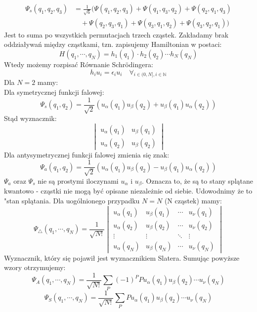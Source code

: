 \begin{align*}
    \Psi_s (q_1, q_2, q_3) &= \frac{1}{\sqrt{6}} \big( 
        \Psi(q_1, q_2, q_3) + \Psi(q_1, q_3, q_2) + \Psi(q_2, q_1, q_3) \\
        &\quad + \Psi(q_2, q_3, q_1) + \Psi(q_3, q_1, q_2) + \Psi(q_3, q_2, q_1)
    \big)
\end{align*}
%
Jest to suma po wszystkich permutacjach trzech cząstek.
%
Zakładamy brak oddziaływań między cząstkami, tzn. zapisujemy Hamiltonian w postaci:
%
\begin{equation*}
    H(q_1, \cdots, q_N) = h_1(q_1) \cdot h_2(q_2) \cdots h_N(q_N)
\end{equation*}
%
Wtedy możemy rozpisać Równanie Schrödingera:
%
\begin{equation*}
    h_i u_i = \epsilon_i u_i \quad \forall_{i \in (0, N], i \in \mathbb{N}}
\end{equation*}
%
Dla $N = 2$ mamy:
%
\\
%
Dla symetrycznej funkcji falowej:
\begin{equation*}
    \Psi_s(q_1, q_2) = \frac{1}{\sqrt{2}} (u_\alpha(q_1) u_\beta(q_2) + u_\beta(q_1) u_\alpha(q_2))
\end{equation*}
%
Stąd wyznacznik:
\begin{equation*}
    \begin{vmatrix}
        u_\alpha(q_1) & u_\beta(q_1) \\
        u_\alpha(q_2) & u_\beta(q_2)
    \end{vmatrix}
\end{equation*}
%
Dla antysymetrycznej funkcji falowej zmienia się znak:
%
\begin{equation*}
    \Psi_a(q_1, q_2) = \frac{1}{\sqrt{2}} (u_\alpha(q_1) u_\beta(q_2) - u_\beta(q_1) u_\alpha(q_2))
\end{equation*}
%
$\Psi_a$ oraz $\Psi_s$ nie są prostymi iloczynami $u_\alpha$ i $u_\beta$.
Oznacza to, że są to stany splątane kwantowo - cząstki nie mogą być opisane niezależnie od siebie.
Udowodnimy że to "stan splątania. Dla uogólnionego przypadku $N = N$ (N cząstek) mamy:
%
\begin{equation*}
    \Psi_\triangle (q_1, \cdots, q_N) = \frac{1}{\sqrt{N!}}
    \begin{vmatrix}
        u_\alpha(q_1) & u_\beta(q_1) & \cdots & u_\nu(q_1) \\
        u_\alpha(q_2) & u_\beta(q_2) & \cdots & u_\nu(q_2) \\
        \vdots & \vdots & \ddots & \vdots \\
        u_\alpha(q_N) & u_\beta(q_N) & \cdots & u_\nu(q_N)
    \end{vmatrix}
\end{equation*}
%
Wyznacznik, który się pojawił jest wyznacznikiem Slatera.
%
Sumując powyższe wzory otrzymujemy:
%
\begin{equation*}
    \Psi_A (q_1, \cdots, q_N) = \frac{1}{\sqrt{N!}} \sum_{P} (-1)^{P} P u_\alpha(q_1) u_\beta(q_2) \cdots u_\nu(q_N)
\end{equation*}
%
\begin{equation*}
    \Psi_S (q_1, \cdots, q_N) = \frac{1}{\sqrt{N!}} \sum_{P} P u_\alpha(q_1) u_\beta(q_2) \cdots u_\nu(q_N)
\end{equation*}
%
